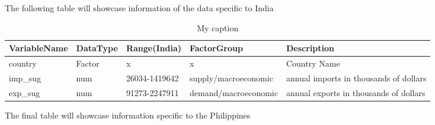 \documentclass[12pt,a4paper,english]{article}
\begin{document}
The following table will showcase information of the data specific to India
\FloatBarrier
\begin{table}[!htbp]
\centering
\begin{adjustbox}{max width=\textwidth}
\begin{tabular}{lllll}
\hline
VariableName & DataType & Range(India)  & FactorGroup          & Description                            \\  \hline
country      & Factor   & x             & x                    & Country Name                           \\
imp\_sug     & num      & 26034-1419642 & supply/macroeconomic & annual imports in thousands of dollars \\
exp\_sug     & num      & 91273-2247911 & demand/macroeconomic & annual exports in thousands of dollars \\ \hline
\end{tabular}
\end{adjustbox}
\caption{My caption}
\label{my-label}
\end{table}
\FloatBarrier

The final table will showcase information specific to the Philippines 
\FloatBarrier
\begin{table}[!htbp]
\centering
{}
\caption{My caption}
\label{my-label}
\end{table}
\FloatBarrier
\end{document}
